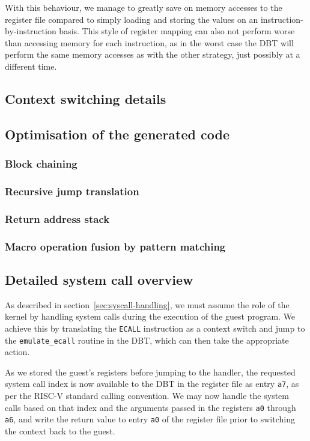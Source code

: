 With this behaviour, we manage to greatly save on memory accesses to the register file compared to simply loading and storing the values on an instruction-by-instruction basis.
This style of register mapping can also not perform worse than accessing memory for each instruction, as in the worst case the DBT will perform the same memory accesses as with the other strategy, just possibly at a different time.


\subsection{Context switching details}

\subsection{Optimisation of the generated code}
\label{sec:optimise}
\subsubsection{Block chaining}
\subsubsection{Recursive jump translation}
\subsubsection{Return address stack}
\subsubsection{Macro operation fusion by pattern matching}

\subsection{Detailed system call overview}

As described in section~\vref{sec:syscall-handling}, we must assume the role of the kernel by handling system calls during the execution of the guest program.
We achieve this by translating the \texttt{ECALL} instruction as a context switch and jump to the \texttt{emulate\_ecall} routine in the DBT, which can then take the appropriate action.

As we stored the guest's registers before jumping to the handler, the requested system call index is now available to the DBT in the register file as entry \texttt{a7}, as per the RISC-V standard calling convention.
We may now handle the system calls based on that index and the arguments passed in the registers \texttt{a0} through \texttt{a6}, and write the return value to entry \texttt{a0} of the register file prior to switching the context back to the guest.


